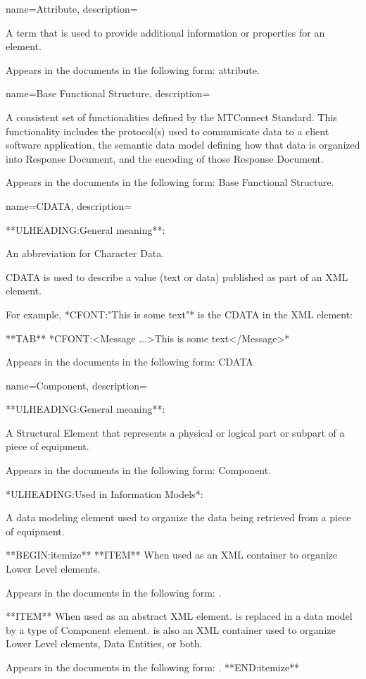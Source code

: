{
    name={Attribute},
	description={
  A term that is used to provide additional information or properties for an element.

  Appears in the documents in the following form: attribute.
}
}

{
    name={Base Functional Structure},
	description={
  A consistent set of functionalities defined by the MTConnect Standard. This functionality includes the protocol(s) used to communicate data to a client software application, the \gls{semantic data model} defining how that data is organized into \gls{Response Document}, and the encoding of those \gls{Response Document}.

  Appears in the documents in the following form: \gls{Base Functional Structure}.
}
}

{
    name={CDATA},
	description={
  **ULHEADING:General meaning**:

  An abbreviation for Character Data.

  \gls{CDATA} is used to describe a value (text or data) published as part of an XML element.

  For example, *CFONT:"This is some text"* is the \gls{CDATA} in the XML element:
  
  **TAB** *CFONT:<Message ...>This is some text</Message>*

  Appears in the documents in the following form: \gls{CDATA}
}
}

{
    name={Component},
	description={
  **ULHEADING:General meaning**:

  A \gls{Structural Element} that represents a physical or logical part or subpart of a piece of equipment.

  Appears in the documents in the following form: \gls{Component}.

  *ULHEADING:Used in \gls{Information Models}*:

  A data modeling element used to organize the data being retrieved from a piece of equipment.
  
  **BEGIN:itemize**
      **ITEM** When used as an XML container to organize \gls{Lower Level}  elements. 
      
      Appears in the documents in the following form: .
      
      **ITEM** When used as an abstract XML element.  is replaced in a data model by a type of \gls{Component} element.  is also an XML container used to organize \gls{Lower Level}  elements, \gls{Data Entities}, or both.
      
      Appears in the documents in the following form: .
  **END:itemize**
}
}


